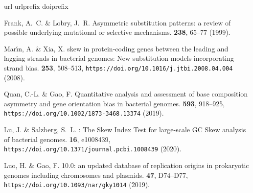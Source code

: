 \documentclass[fleqn,10pt]{wlscirep}
\begin{document}
\begin{thebibliography}{10}
\expandafter\ifx\csname url\endcsname\relax
  \def\url#1{\texttt{#1}}\fi
\expandafter\ifx\csname urlprefix\endcsname\relax\def\urlprefix{URL }\fi
\expandafter\ifx\csname doiprefix\endcsname\relax\def\doiprefix{DOI: }\fi
\providecommand{\bibinfo}[2]{#2}
\providecommand{\eprint}[2][]{\url{#2}}

\bibinfo{author}{Frank, A.~C.} \& \bibinfo{author}{Lobry, J.~R.}
\newblock \bibinfo{journal}{\bibinfo{title}{Asymmetric substitution patterns: a
  review of possible underlying mutational or selective mechanisms.}}
 \textbf{\bibinfo{volume}{238}},
  \bibinfo{pages}{65--77} (\bibinfo{year}{1999}).

\bibinfo{author}{Mar{\'{\i}}n, A.} \& \bibinfo{author}{Xia, X.}
\newblock \bibinfo{journal}{\bibinfo{title}{{GC} skew in protein-coding genes
  between the leading and lagging strands in bacterial genomes: New
  substitution models incorporating strand bias}}.
  \textbf{\bibinfo{volume}{253}}, \bibinfo{pages}{508--513},
  \url{https://doi.org/10.1016/j.jtbi.2008.04.004} (\bibinfo{year}{2008}).

\bibinfo{author}{Quan, C.-L.} \& \bibinfo{author}{Gao, F.}
\newblock \bibinfo{journal}{\bibinfo{title}{Quantitative analysis and
  assessment of base composition asymmetry and gene orientation bias in
  bacterial genomes}}.
  \textbf{\bibinfo{volume}{593}}, \bibinfo{pages}{918--925},
  \url{https://doi.org/10.1002/1873-3468.13374} (\bibinfo{year}{2019}).

\bibinfo{author}{Lu, J.} \& \bibinfo{author}{Salzberg, S.~L.}
\newblock \bibinfo{journal}{\bibinfo{title}{{SkewIT}: {The} {Skew} {Index}
  {Test} for large-scale {GC} {Skew} analysis of bacterial genomes}}.
  \textbf{\bibinfo{volume}{16}}, \bibinfo{pages}{e1008439},
  \url{https://doi.org/10.1371/journal.pcbi.1008439} (\bibinfo{year}{2020}).

\bibinfo{author}{Luo, H.} \& \bibinfo{author}{Gao, F.}
\newblock \bibinfo{journal}{\bibinfo{title}{{DoriC} 10.0: an updated database
  of replication origins in prokaryotic genomes including chromosomes and
  plasmids}}.
  \textbf{\bibinfo{volume}{47}}, \bibinfo{pages}{D74--D77},
  \url{https://doi.org/10.1093/nar/gky1014} (\bibinfo{year}{2019}).


\end{thebibliography}
\end{document}
